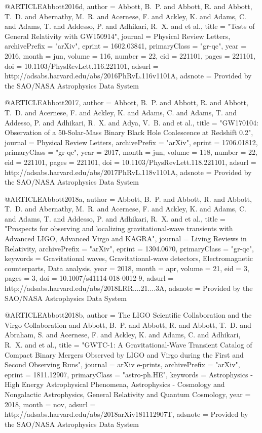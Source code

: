 \documentclass[twocolumn,tighten]{aastex63}
\begin{document}
{{{{{@ARTICLE{Abbott2016d,
   author = {{Abbott}, B.~P. and {Abbott}, R. and {Abbott}, T.~D. and {Abernathy}, M.~R. and 
	{Acernese}, F. and {Ackley}, K. and {Adams}, C. and {Adams}, T. and 
	{Addesso}, P. and {Adhikari}, R.~X. and et al.},
    title = "{Tests of General Relativity with GW150914}",
  journal = {Physical Review Letters},
archivePrefix = "arXiv",
   eprint = {1602.03841},
 primaryClass = "gr-qc",
     year = 2016,
    month = jun,
   volume = 116,
   number = 22,
      eid = {221101},
    pages = {221101},
      doi = {10.1103/PhysRevLett.116.221101},
   adsurl = {http://adsabs.harvard.edu/abs/2016PhRvL.116v1101A},
  adsnote = {Provided by the SAO/NASA Astrophysics Data System}
}


@ARTICLE{Abbott2017,
   author = {{Abbott}, B.~P. and {Abbott}, R. and {Abbott}, T.~D. and {Acernese}, F. and 
	{Ackley}, K. and {Adams}, C. and {Adams}, T. and {Addesso}, P. and 
	{Adhikari}, R.~X. and {Adya}, V.~B. and et al.},
    title = "{GW170104: Observation of a 50-Solar-Mass Binary Black Hole Coalescence at Redshift 0.2}",
  journal = {Physical Review Letters},
archivePrefix = "arXiv",
   eprint = {1706.01812},
 primaryClass = "gr-qc",
     year = 2017,
    month = jun,
   volume = 118,
   number = 22,
      eid = {221101},
    pages = {221101},
      doi = {10.1103/PhysRevLett.118.221101},
   adsurl = {http://adsabs.harvard.edu/abs/2017PhRvL.118v1101A},
  adsnote = {Provided by the SAO/NASA Astrophysics Data System}
}

@ARTICLE{Abbott2018a,
   author = {{Abbott}, B.~P. and {Abbott}, R. and {Abbott}, T.~D. and {Abernathy}, M.~R. and 
	{Acernese}, F. and {Ackley}, K. and {Adams}, C. and {Adams}, T. and 
	{Addesso}, P. and {Adhikari}, R.~X. and et al.},
    title = "{Prospects for observing and localizing gravitational-wave transients with Advanced LIGO, Advanced Virgo and KAGRA}",
  journal = {Living Reviews in Relativity},
archivePrefix = "arXiv",
   eprint = {1304.0670},
 primaryClass = "gr-qc",
 keywords = {Gravitational waves, Gravitational-wave detectors, Electromagnetic counterparts, Data analysis},
     year = 2018,
    month = apr,
   volume = 21,
      eid = {3},
    pages = {3},
      doi = {10.1007/s41114-018-0012-9},
   adsurl = {http://adsabs.harvard.edu/abs/2018LRR....21....3A},
  adsnote = {Provided by the SAO/NASA Astrophysics Data System}
}

@ARTICLE{Abbott2018b,
   author = {{The LIGO Scientific Collaboration} and {the Virgo Collaboration} and 
	{Abbott}, B.~P. and {Abbott}, R. and {Abbott}, T.~D. and {Abraham}, S. and 
	{Acernese}, F. and {Ackley}, K. and {Adams}, C. and {Adhikari}, R.~X. and et al.},
    title = "{GWTC-1: A Gravitational-Wave Transient Catalog of Compact Binary Mergers Observed by LIGO and Virgo during the First and Second Observing Runs}",
  journal = {arXiv e-prints},
archivePrefix = "arXiv",
   eprint = {1811.12907},
 primaryClass = "astro-ph.HE",
 keywords = {Astrophysics - High Energy Astrophysical Phenomena, Astrophysics - Cosmology and Nongalactic Astrophysics, General Relativity and Quantum Cosmology},
     year = 2018,
    month = nov,
   adsurl = {http://adsabs.harvard.edu/abs/2018arXiv181112907T},
  adsnote = {Provided by the SAO/NASA Astrophysics Data System}
}

}}}}}
\end{document}
